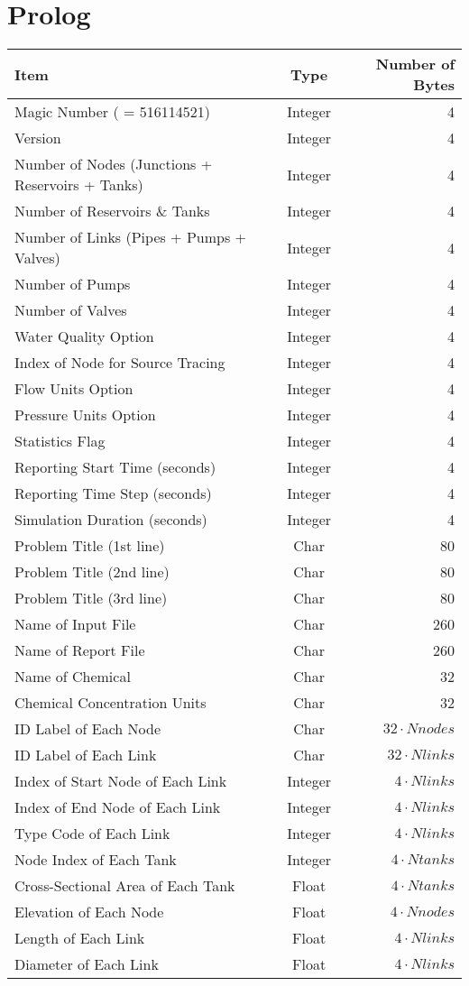 \section{Prolog}

\begin{tabular}{|l|c|r|}
\hline
Item& Type & Number of Bytes  \\
\hline
Magic Number ( = 516114521)& Integer& 4 \\
Version& Integer &4 \\
Number of Nodes (Junctions + Reservoirs + Tanks) & Integer &4\\
Number of Reservoirs \& Tanks &Integer &4\\
Number of Links (Pipes + Pumps + Valves)&Integer& 4\\
Number of Pumps& Integer& 4\\
Number of Valves& Integer& 4\\
Water Quality Option&Integer& 4\\
Index of Node for Source Tracing& Integer& 4\\
Flow Units Option&Integer &4\\
Pressure Units Option & Integer & 4 \\
Statistics Flag& Integer & 4\\
Reporting Start Time (seconds) & Integer & 4 \\
Reporting Time Step (seconds) & Integer & 4 \\
Simulation Duration (seconds) & Integer & 4 \\
Problem Title (1st line) & Char & 80 \\
Problem Title (2nd line) & Char & 80 \\
Problem Title (3rd line) & Char & 80 \\
Name of Input File & Char & 260   \\
Name of Report File & Char & 260  \\
Name of Chemical & Char & 32      \\
Chemical Concentration Units & Char & 32 \\
ID Label of Each Node & Char & $32 \cdot Nnodes$ \\
ID Label of Each Link & Char & $32 \cdot Nlinks$ \\
Index of Start Node of Each Link & Integer & $4 \cdot Nlinks$ \\
Index of End Node of Each Link & Integer & $4 \cdot Nlinks$   \\
Type Code of Each Link & Integer & $4 \cdot Nlinks$           \\
Node Index of Each Tank & Integer & $4 \cdot Ntanks$          \\
Cross-Sectional Area of Each Tank & Float & $4 \cdot Ntanks$  \\
Elevation of Each Node & Float & $4 \cdot Nnodes$             \\
Length of Each Link & Float & $4 \cdot Nlinks$                \\
Diameter of Each Link & Float & $4 \cdot Nlinks$              \\
\hline
\end{tabular}
